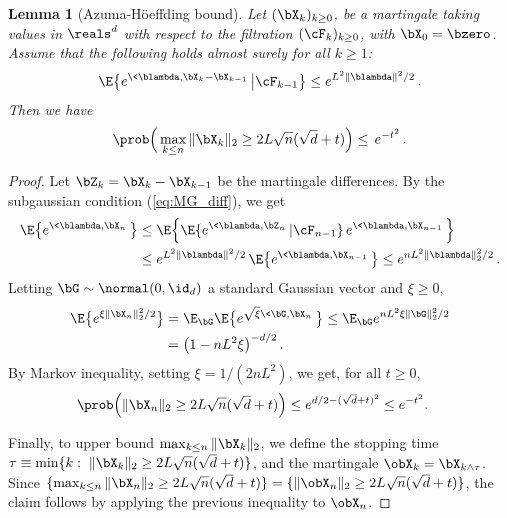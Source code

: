 \documentclass[11pt]{article}
\newtheorem{lemma}{Lemma}
\begin{document}
\begin{lemma}[Azuma-H\"oeffding bound]\label{lemma:AH}
Let $(\bX_k)_{k\ge 0}$, be a martingale taking values in $\reals^d$ with respect to the filtration $(\cF_k)_{k\ge 0}$, with $\bX_0= \bzero$.
Assume  that the following holds almost surely for all $k\ge 1$:
%
\begin{align}
%
\E\big\{ e^{\<\blambda,\bX_k-\bX_{k-1}\>}\big|\cF_{k-1}\big\}\le e^{L^2\|\blambda\|^2/2}\, . \label{eq:MG_diff}
%
\end{align}
%
Then we have
%
\begin{align}
%
\prob\Big(\max_{k\le n}\|\bX_k\|_2\ge 2 L\sqrt{n} (\sqrt{d} + t)\Big)\le \, e^{-t^2}\, .
%
\end{align}
\end{lemma}
%
\begin{proof}
%
Let $\bZ_k = \bX_k-\bX_{k-1}$ be the martingale differences. By the subgaussian condition (\ref{eq:MG_diff}), we get
%
\begin{align}
%
\E\big\{ e^{\<\blambda,\bX_{n}\>}\big\} &\le \E\Big\{\E\{e^{\<\blambda,\bZ_n\>}|\cF_{n-1}\}\, e^{\<\blambda,\bX_{n-1}\>}\Big\}\\
& \le e^{L^2\|\blambda\|^2/2}\, \E\big\{ e^{\<\blambda,\bX_{n-1}\>}\big\} \le e^{n L^2\|\blambda\|_2^2/2}\, .
%
\end{align}
%
Letting $\bG\sim\normal(0,\id_d)$ a standard Gaussian vector and $\xi\ge 0$,
%
\begin{align}
%
\E\big\{e^{\xi\|\bX_n\|_2^2/2}\big\} &=  \E_{\bG}\E\big\{e^{\sqrt{\xi}\<\bG,\bX_n\>}\big\} \le    \E_{\bG} e^{nL^2 \xi\|\bG\|_2^2/2}\\
& = \big(1-n L^2 \xi\big)^{-d/2}\, .
%
\end{align}
%
By Markov inequality, setting $\xi = 1/(2 n L^2)$, we get, for all $t \ge 0$,
%
\begin{align}
\prob\Big(\|\bX_n\|_2\ge 2 L\sqrt{n} (\sqrt{d} + t)\Big)&\le e^{d/2 - (\sqrt{d} + t)^2} \le e^{-t^2}. 
\end{align}
%

Finally, to upper bound $\max_{k\le n}\|\bX_k\|_2$, we define the stopping time $\tau\equiv \min\{k :\; \| \bX_k\|_2\ge 2L\sqrt{n} (\sqrt{d} + t) \}$,
and the martingale $\obX_k =\bX_{k\wedge \tau}$. Since $\{\max_{k\le n}\|\bX_n\|_2\ge  2L\sqrt{n} (\sqrt{d} + t) \} =\{\|\obX_n\|_2\ge  2L\sqrt{n} (\sqrt{d} + t) \} $, the claim follows by applying the previous inequality to $\obX_n$.
\end{proof}
\end{document}
